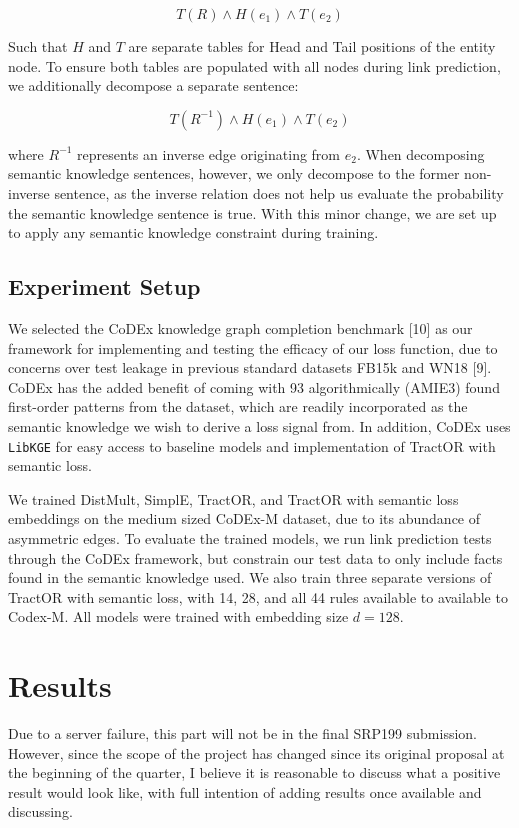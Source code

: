 \documentclass{article}
\begin{document}
\[ T(R) \land H(e_1) \land T(e_2) \]

Such that \(H\) and \(T\) are separate tables for Head and Tail positions of the
entity node. To ensure both tables are populated with all nodes during link
prediction, we additionally decompose a separate sentence:

\[ T(R^{-1}) \land H(e_1) \land T(e_2) \]

where \(R^{-1}\) represents an inverse edge originating from \(e_2\).
When decomposing semantic knowledge sentences, however, we only decompose to the
former non-inverse sentence, as the inverse relation does not help us evaluate
the probability the semantic knowledge sentence is true. With this minor change,
we are set up to apply any semantic knowledge constraint during training.

\subsection{Experiment Setup}

We selected the CoDEx knowledge graph completion benchmark [10] as our framework for
implementing and testing the efficacy of our loss function, due to concerns over
test leakage in previous standard datasets FB15k and WN18 [9]. CoDEx has the added
benefit of coming with 93 algorithmically (AMIE3) found first-order patterns
from the dataset, which are readily incorporated as the semantic knowledge we
wish to derive a loss signal from. In addition, CoDEx uses \texttt{LibKGE} for
easy access to baseline models and implementation of TractOR with semantic loss.

We trained DistMult, SimplE, TractOR, and TractOR with semantic loss embeddings
on the medium sized CoDEx-M dataset, due to its abundance of asymmetric edges.
To evaluate the trained models, we run link prediction tests through the CoDEx
framework, but constrain our test data to only include facts found in the
semantic knowledge used. We also train three separate versions of TractOR with
semantic loss, with 14, 28, and all 44 rules available to available to Codex-M.
All models were trained with embedding size \(d = 128\).

\section{Results}

Due to a server failure, this part will not be in the final SRP199 submission.
However, since the scope of the project has changed since its original proposal
at the beginning of the quarter, I believe it is reasonable to discuss what a
positive result would look like, with full intention of adding results once
available and discussing.
\end{document}
